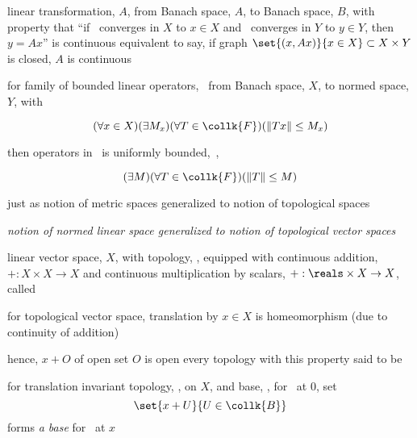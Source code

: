 \documentclass[17pt,landscape]{foils}
\newcommand\collB{\collk{B}}
\newcommand{\tJ}{\topol{J}}
\begin{document}
{{	\vvitem {} linear transformation, $A$, from Banach space, $A$, to Banach space, $B$,
		with property that
		``if \ converges in $X$ to $x\in X$ and \ converges in $Y$ to $y\in Y$,
		then $y=Ax$''
		is continuous
	\bit
		\vitem equivalent to say, if graph $\set{(x,Ax)}{x\in X}\subset X\times Y$ is closed,
			$A$ is continuous
	\eit
\eit



\bit
	\item {}
		for family of bounded linear operators, \ from Banach space, $X$, to normed space, $Y$,
		with

		\[
			(
				\forall x \in X
			)
			(
				\exists M_x
			)
			(
				\forall T \in \collk{F}
			)
			(
				\|Tx\| \leq M_x
			)
		\]

		\vfill
		then operators in \ is uniformly bounded,\
		\ie,

		\[
			(
				\exists M
			)
			(
				\forall T \in \collk{F}
			)
			(
				\|T\| \leq M
			)
		\]
\eit
\vfill
\vfill
\vfill



\bit
	\item just as notion of metric spaces generalized to notion of topological spaces

	\vitem \emph{notion of normed linear space generalized to notion of topological vector spaces}

	\vitem linear vector space, $X$, with topology, \tJ, equipped with
		continuous addition, $+:X\times X\to X$
		and
		continuous multiplication by scalars, $+:\reals\times X\to X$,
		called 
\eit



\bit
	\item for topological vector space,
		translation by $x\in X$ is homeomorphism (due to continuity of addition)
	\bit
		\item hence, $x+O$ of open set $O$ is open
		\vitem every topology with this property said to be 
	\eit

	\vitem for translation invariant topology, \tJ, on $X$,
		and
		base, \collB, for \tJ\ at $0$,
		set
		\[
			\set{x+U}{U\in \collB}
		\]
		forms \emph{a base} for \tJ\ at $x$

}}
\end{document}
